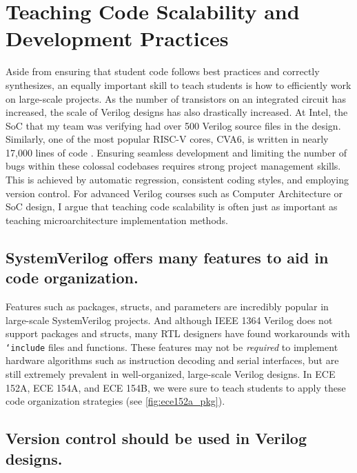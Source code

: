 
\chapter{Teaching Code Scalability and Development Practices}
\label{chapter:scalability}

Aside from ensuring that student code follows best practices and correctly synthesizes, an equally important skill to teach students is how to efficiently work on large-scale projects. As the number of transistors on an integrated circuit has increased, the scale of Verilog designs has also drastically increased. At Intel, the SoC that my team was verifying had over 500 Verilog source files in the design. Similarly, one of the most popular RISC-V cores, CVA6, is written in nearly 17,000 lines of code \cite{cva6}. Ensuring seamless development and limiting the number of bugs within these colossal codebases requires strong project management skills. This is achieved by automatic regression, consistent coding styles, and employing version control. For advanced Verilog courses such as Computer Architecture or SoC design, I argue that teaching code scalability is often just as important as teaching microarchitecture implementation methods.

\section{SystemVerilog offers many features to aid in code organization.}



Features such as packages, structs, and parameters are incredibly popular in large-scale SystemVerilog projects. And although IEEE 1364 Verilog does not support packages and structs, many RTL designers have found workarounds with \texttt{`include} files and functions. \cite{lowRISCstyleguides, zachjssv2vGitHub} These features may not be \emph{required} to implement hardware algorithms such as instruction decoding and serial interfaces, but are still extremely prevalent in well-organized, large-scale Verilog designs. In ECE 152A, ECE 154A, and ECE 154B, we were sure to teach students to apply these code organization strategies (see \autoref{fig:ece152a_pkg}).

\section{Version control should be used in Verilog designs.}

